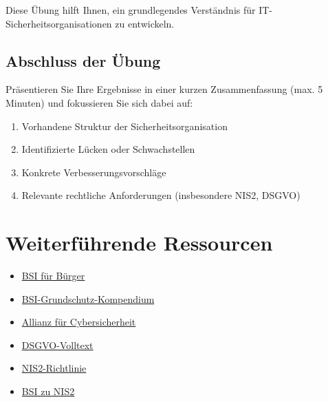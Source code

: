 \documentclass{orgstandard}
\begin{document}
Diese Übung hilft Ihnen, ein grundlegendes Verständnis für IT-Sicherheitsorganisationen zu entwickeln.
\subsection{Abschluss der Übung}
\label{sec:orgfb896fc}

Präsentieren Sie Ihre Ergebnisse in einer kurzen Zusammenfassung (max. 5 Minuten) und fokussieren Sie sich dabei auf:
\begin{enumerate}
\item Vorhandene Struktur der Sicherheitsorganisation
\item Identifizierte Lücken oder Schwachstellen
\item Konkrete Verbesserungsvorschläge
\item Relevante rechtliche Anforderungen (insbesondere NIS2, DSGVO)
\end{enumerate}
\section{Weiterführende Ressourcen}
\label{sec:org8ec0507}
\begin{itemize}
\item \href{https://www.bsi-fuer-buerger.de}{BSI für Bürger}
\item \href{https://www.bsi.bund.de/DE/Themen/Unternehmen-und-Organisationen/Standards-und-Zertifizierung/IT-Grundschutz/IT-Grundschutz-Kompendium/it-grundschutz-kompendium\_node.html}{BSI-Grundschutz-Kompendium}
\item \href{https://www.allianz-fuer-cybersicherheit.de}{Allianz für Cybersicherheit}
\item \href{https://dsgvo-gesetz.de}{DSGVO-Volltext}
\item \href{https://eur-lex.europa.eu/legal-content/DE/TXT/HTML/?uri=CELEX:32022L2555}{NIS2-Richtlinie}
\item \href{https://www.bsi.bund.de/DE/Themen/Regulierte-Wirtschaft/NIS-2-regulierte-Unternehmen/nis-2-regulierte-unternehmen\_node.html}{BSI zu NIS2}
\end{itemize}
\end{document}
